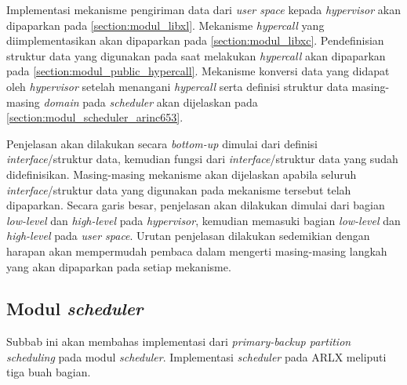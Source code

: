 Implementasi mekanisme pengiriman data dari \textit{user space} kepada \textit{hypervisor} akan
dipaparkan pada \autoref{section:modul_libxl}. Mekanisme \textit{hypercall} yang
diimplementasikan akan dipaparkan pada \autoref{section:modul_libxc}. Pendefinisian struktur
data yang digunakan pada saat melakukan \textit{hypercall} akan dipaparkan pada
\autoref{section:modul_public_hypercall}. Mekanisme konversi data yang didapat oleh
\textit{hypervisor} setelah menangani \textit{hypercall} serta definisi struktur data
masing-masing \textit{domain} pada \textit{scheduler} akan dijelaskan pada
\autoref{section:modul_scheduler_arinc653}.

Penjelasan akan dilakukan secara \textit{bottom-up} dimulai dari definisi
\textit{interface}/struktur data, kemudian fungsi dari \textit{interface}/struktur data yang
sudah didefinisikan. Masing-masing mekanisme akan dijelaskan apabila seluruh
\textit{interface}/struktur data yang digunakan pada mekanisme tersebut telah dipaparkan. Secara
garis besar, penjelasan akan dilakukan dimulai dari bagian \textit{low-level} dan
\textit{high-level} pada \textit{hypervisor}, kemudian memasuki bagian \textit{low-level} dan
\textit{high-level} pada \textit{user space}. Urutan penjelasan dilakukan sedemikian dengan
harapan akan mempermudah pembaca dalam mengerti masing-masing langkah yang akan dipaparkan pada
setiap mekanisme.

\subsection{Modul \textit{scheduler}}
\label{section:modul_scheduler_arinc653}

Subbab ini akan membahas implementasi dari \textit{primary-backup partition scheduling} pada
modul \textit{scheduler}. Implementasi \textit{scheduler} pada ARLX meliputi tiga buah
bagian.


